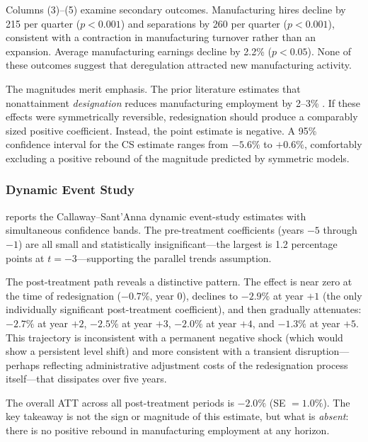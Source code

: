 \documentclass[12pt]{article}
\begin{document}
Columns (3)--(5) examine secondary outcomes. Manufacturing hires decline by 215 per quarter ($p < 0.001$) and separations by 260 per quarter ($p < 0.001$), consistent with a contraction in manufacturing turnover rather than an expansion. Average manufacturing earnings decline by 2.2\% ($p < 0.05$). None of these outcomes suggest that deregulation attracted new manufacturing activity.

The magnitudes merit emphasis. The prior literature estimates that nonattainment \textit{designation} reduces manufacturing employment by 2--3\% \citep{Greenstone2002, Curtis2018}. If these effects were symmetrically reversible, redesignation should produce a comparably sized positive coefficient. Instead, the point estimate is negative. A 95\% confidence interval for the CS estimate ranges from $-5.6\%$ to $+0.6\%$, comfortably excluding a positive rebound of the magnitude predicted by symmetric models.



\subsubsection*{Dynamic Event Study}  reports the Callaway--Sant'Anna dynamic event-study estimates with simultaneous confidence bands. The pre-treatment coefficients (years $-5$ through $-1$) are all small and statistically insignificant---the largest is 1.2 percentage points at $t = -3$---supporting the parallel trends assumption.

The post-treatment path reveals a distinctive pattern. The effect is near zero at the time of redesignation ($-0.7\%$, year 0), declines to $-2.9\%$ at year $+1$ (the only individually significant post-treatment coefficient), and then gradually attenuates: $-2.7\%$ at year $+2$, $-2.5\%$ at year $+3$, $-2.0\%$ at year $+4$, and $-1.3\%$ at year $+5$. This trajectory is inconsistent with a permanent negative shock (which would show a persistent level shift) and more consistent with a transient disruption---perhaps reflecting administrative adjustment costs of the redesignation process itself---that dissipates over five years.

The overall ATT across all post-treatment periods is $-2.0\%$ (SE $= 1.0\%$). The key takeaway is not the sign or magnitude of this estimate, but what is \textit{absent}: there is no positive rebound in manufacturing employment at any horizon.


\end{document}

